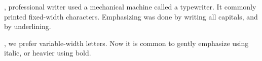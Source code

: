 \documentclass{book}%
\begin{document}
, professional
writer used a mechanical machine called a typewriter.
It commonly printed fixed-width characters. Emphasizing
was done by writing all capitals, and by underlining.

, we prefer variable-width
letters. Now it is common to gently emphasize using italic,
or heavier using bold.
\end{document}
